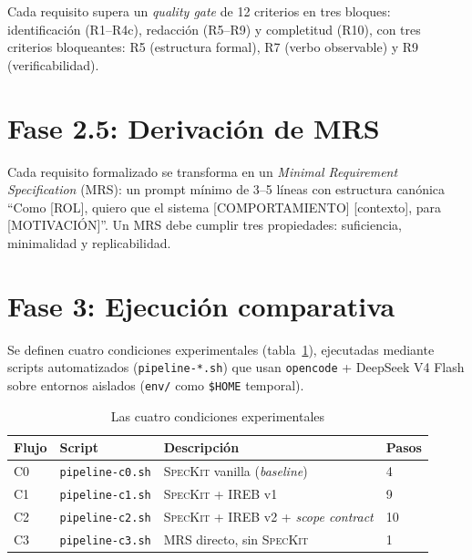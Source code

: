 Cada requisito supera un \emph{quality gate} de 12 criterios en tres bloques: identificaci\'on (R1--R4c), redacci\'on (R5--R9) y completitud (R10), con tres criterios bloqueantes: R5 (estructura formal), R7 (verbo observable) y R9 (verificabilidad).

\section{Fase 2.5: Derivaci\'on de MRS}

Cada requisito formalizado se transforma en un \emph{Minimal Requirement Specification} (MRS): un prompt m\'inimo de 3--5 l\'ineas con estructura can\'onica ``Como [ROL], quiero que el sistema [COMPORTAMIENTO] [contexto], para [MOTIVACI\'ON]''. Un MRS debe cumplir tres propiedades: suficiencia, minimalidad y replicabilidad.

\section{Fase 3: Ejecuci\'on comparativa}

Se definen cuatro condiciones experimentales (tabla~\ref{tab:flujos}), ejecutadas mediante scripts automatizados (\texttt{pipeline-*.sh}) que usan \texttt{opencode} + DeepSeek V4 Flash sobre entornos aislados (\texttt{env/} como \texttt{\$HOME} temporal).

\begin{table}[htbp]
\centering
\caption{Las cuatro condiciones experimentales}
\label{tab:flujos}
\begin{tabularx}{\textwidth}{llXl}
\toprule
\textbf{Flujo} & \textbf{Script} & \textbf{Descripci\'on} & \textbf{Pasos} \\
\midrule
C0 & \texttt{pipeline-c0.sh} & \textsc{SpecKit} vanilla (\emph{baseline}) & 4 \\
C1 & \texttt{pipeline-c1.sh} & \textsc{SpecKit} + IREB v1 & 9 \\
C2 & \texttt{pipeline-c2.sh} & \textsc{SpecKit} + IREB v2 + \emph{scope contract} & 10 \\
C3 & \texttt{pipeline-c3.sh} & MRS directo, sin \textsc{SpecKit} & 1 \\
\bottomrule
\end{tabularx}
\end{table}

